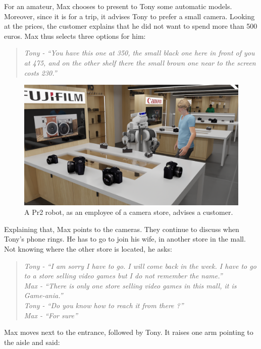 For an amateur, Max chooses to present to Tony some automatic models. Moreover, since it is for a trip, it advises Tony to prefer a small camera. Looking at the prices, the customer explains that he did not want to spend more than 500 euros. Max thus selects three options for him:

\begin{quote} 
\centering 
\textit{
Tony - ``You have this one at 350, the small black one here in front of you at 475, and on the other shelf there the small brown one near to the screen costs 230.'' }
\end{quote}

\begin{figure}[h!]
\centering
\includegraphics[width=\textwidth]{figures/introduction/camera_store_2.png}
\caption{\label{fig:cam_store} A Pr2 robot, as an employee of a camera store, advises a customer. }
\end{figure}

Explaining that, Max points to the cameras. They continue to discuss when Tony's phone rings. He has to go to join his wife, in another store in the mall. Not knowing where the other store is located, he asks:

\begin{quote}
\textit{
Tony - ``I am sorry I have to go. I will come back in the week. I have to go to a store selling video games but I do not remember the name.'' \\
Max - ``There is only one store selling video games in this mall, it is Game-ania.'' \\
Tony - ``Do you know how to reach it from there ?'' \\
Max - ``For sure''}
\end{quote}

Max moves next to the entrance, followed by Tony. It raises one arm pointing to the aisle and said:

